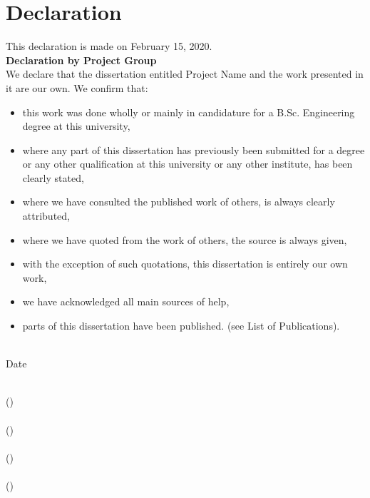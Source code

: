 \chapter*{Declaration}


\begin{flushleft}
	This declaration is made on February 15, 2020. \\
	\vspace{10mm}
	\textbf{Declaration by Project Group} \\
	We declare that the dissertation entitled Project Name and the work presented in it are our own. We confirm that:
	
	\begin{itemize}[noitemsep,topsep=0pt]
		\item this work was done wholly or mainly in candidature for a B.Sc. Engineering degree at this university,
		\item where any part of this dissertation has previously been submitted for a degree or any other qualification at this university or any other institute, has been clearly stated,
		\item where we have consulted the published work of others, is always clearly attributed,
		\item where we have quoted from the work of others, the source is always given,
		\item with the exception of such quotations, this dissertation is entirely our own work,
		\item we have acknowledged all main sources of help,
		\item parts of this dissertation have been published. (see List of Publications).
	\end{itemize}

\vspace{15mm}
\begin{multicols}{2}
	{\makebox[3cm]{\dotfill}} \\ 
	Date
	\vfill\null
	\columnbreak
	
	{\makebox[7cm]{\dotfill}} \\ 
	\memberA (\indexA)  \\
	\vspace{12mm}
	{\makebox[7cm]{\dotfill}} \\ 
	\memberB (\indexB)  \\
	\vspace{12mm}
	{\makebox[7cm]{\dotfill}} \\ 
	\memberC (\indexC)  \\
	\vspace{12mm}
	{\makebox[7cm]{\dotfill}} \\ 
	\memberD (\indexD)  \\

\end{multicols}


\end{flushleft}
